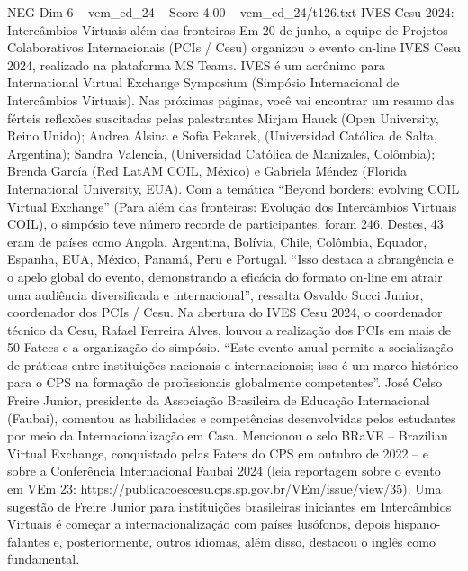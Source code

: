 \begin{textsample}{NEG Dim 6 – vem\_ed\_24 – Score 4.00 – vem\_ed\_24/t126.txt}  \label{ex:f6_neg_106}
IVES Cesu 2024: Intercâmbios Virtuais além das fronteiras Em 20 de junho, a equipe de Projetos Colaborativos Internacionais (PCIs / Cesu) organizou o evento on-line IVES Cesu 2024, realizado na plataforma MS Teams.
IVES é um acrônimo para International Virtual Exchange Symposium (Simpósio Internacional de Intercâmbios Virtuais).
Nas próximas páginas, você vai encontrar um resumo das férteis reflexões suscitadas pelas palestrantes Mirjam Hauck (Open University, Reino Unido); Andrea Alsina e Sofia Pekarek, (Universidad Católica de Salta, Argentina); Sandra Valencia, (Universidad Católica de Manizales, Colômbia); Brenda García (Red LatAM COIL, México) e Gabriela Méndez (Florida International University, EUA).
Com a temática “Beyond borders: evolving COIL Virtual Exchange” (Para além das fronteiras: Evolução dos Intercâmbios Virtuais COIL), o simpósio teve número recorde de participantes, foram 246.
Destes, 43 eram de países como Angola, Argentina, Bolívia, Chile, Colômbia, Equador, Espanha, EUA, México, Panamá, Peru e Portugal. “Isso destaca a abrangência e o apelo global do evento, demonstrando a eficácia do formato on-line em atrair uma audiência diversificada e internacional”, ressalta Osvaldo Succi Junior, coordenador dos PCIs / Cesu.
Na abertura do IVES Cesu 2024, o coordenador técnico da Cesu, Rafael Ferreira Alves, louvou a realização dos PCIs em mais de 50 Fatecs e a organização do simpósio. “Este evento anual permite a socialização de práticas entre instituições nacionais e internacionais; isso é um marco histórico para o CPS na formação de profissionais globalmente competentes”.
José Celso Freire Junior, presidente da Associação Brasileira de Educação Internacional (Faubai), comentou as habilidades e competências desenvolvidas pelos estudantes por meio da Internacionalização em Casa.
Mencionou o selo BRaVE – Brazilian Virtual Exchange, conquistado pelas Fatecs do CPS em outubro de 2022 – e sobre a Conferência Internacional Faubai 2024 (leia reportagem sobre o evento em VEm 23: https://publicacoescesu.cps.sp.gov.br/VEm/issue/view/35).
Uma sugestão de Freire Junior para instituições brasileiras iniciantes em Intercâmbios Virtuais é começar a internacionalização com países lusófonos, depois hispano-falantes e, posteriormente, outros idiomas, além disso, destacou o inglês como fundamental.

\end{textsample}
